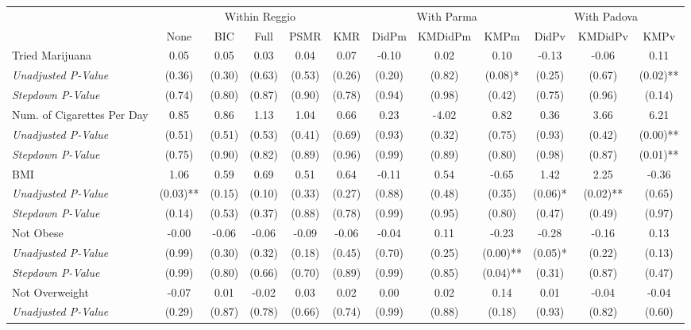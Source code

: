 \begin{tabular}{l c c c c c c c c c c c}
\toprule
& \multicolumn{5}{c}{Within Reggio} & \multicolumn{3}{c}{With Parma} & \multicolumn{3}{c}{With Padova} \\\cmidrule(lr){2-6} \cmidrule(lr){7-9} \cmidrule(lr){10-12}
 & None & BIC & Full & PSMR & KMR & DidPm & KMDidPm & KMPm & DidPv & KMDidPv & KMPv \\
\midrule
Tried Marijuana & 0.05 & 0.05 & 0.03 & 0.04 & 0.07 & -0.10 & 0.02 & 0.10 & -0.13 & -0.06 & 0.11 \\
\quad \textit{Unadjusted P-Value} & (0.36) & (0.30) & (0.63) & (0.53) & (0.26) & (0.20) & (0.82) & (0.08)* & (0.25) & (0.67) & (0.02)** \\
\quad \textit{Stepdown P-Value} & (0.74) & (0.80) & (0.87) & (0.90) & (0.78) & (0.94) & (0.98) & (0.42) & (0.75) & (0.96) & (0.14) \\
Num. of Cigarettes Per Day & 0.85 & 0.86 & 1.13 & 1.04 & 0.66 & 0.23 & -4.02 & 0.82 & 0.36 & 3.66 & 6.21 \\
\quad \textit{Unadjusted P-Value} & (0.51) & (0.51) & (0.53) & (0.41) & (0.69) & (0.93) & (0.32) & (0.75) & (0.93) & (0.42) & (0.00)** \\
\quad \textit{Stepdown P-Value} & (0.75) & (0.90) & (0.82) & (0.89) & (0.96) & (0.99) & (0.89) & (0.80) & (0.98) & (0.87) & (0.01)** \\
BMI & 1.06 & 0.59 & 0.69 & 0.51 & 0.64 & -0.11 & 0.54 & -0.65 & 1.42 & 2.25 & -0.36 \\
\quad \textit{Unadjusted P-Value} & (0.03)** & (0.15) & (0.10) & (0.33) & (0.27) & (0.88) & (0.48) & (0.35) & (0.06)* & (0.02)** & (0.65) \\
\quad \textit{Stepdown P-Value} & (0.14) & (0.53) & (0.37) & (0.88) & (0.78) & (0.99) & (0.95) & (0.80) & (0.47) & (0.49) & (0.97) \\
Not Obese & -0.00 & -0.06 & -0.06 & -0.09 & -0.06 & -0.04 & 0.11 & -0.23 & -0.28 & -0.16 & 0.13 \\
\quad \textit{Unadjusted P-Value} & (0.99) & (0.30) & (0.32) & (0.18) & (0.45) & (0.70) & (0.25) & (0.00)** & (0.05)* & (0.22) & (0.13) \\
\quad \textit{Stepdown P-Value} & (0.99) & (0.80) & (0.66) & (0.70) & (0.89) & (0.99) & (0.85) & (0.04)** & (0.31) & (0.87) & (0.47) \\
Not Overweight & -0.07 & 0.01 & -0.02 & 0.03 & 0.02 & 0.00 & 0.02 & 0.14 & 0.01 & -0.04 & -0.04 \\
\quad \textit{Unadjusted P-Value} & (0.29) & (0.87) & (0.78) & (0.66) & (0.74) & (0.99) & (0.88) & (0.18) & (0.93) & (0.82) & (0.60) \\

\end{tabular}
